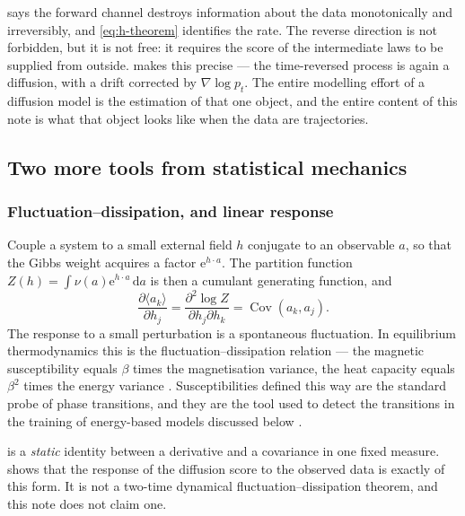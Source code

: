 \documentclass[11pt,a4paper]{article}
\newcommand{\Cov}{\operatorname{Cov}}
\newcommand{\dd}{\,\mathrm d}
\newcommand{\e}{\mathrm e}
\begin{document}
 says the forward channel destroys information about the data
monotonically and irreversibly, and \eqref{eq:h-theorem} identifies the rate. The reverse
direction is not forbidden, but it is not free: it requires the score of the intermediate
laws to be supplied from outside. \citet{anderson1982reverse} makes this precise --- the
time-reversed process is again a diffusion, with a drift corrected by
$\nabla\log p_t$. The entire modelling effort of a diffusion model is the estimation of that
one object, and the entire content of this note is what that object looks like when the data
are trajectories.

\subsection{Two more tools from statistical mechanics}\label{sec:statmech-tools}

\subsubsection{Fluctuation--dissipation, and linear response}

Couple a system to a small external field $h$ conjugate to an observable $a$, so that the
Gibbs weight acquires a factor $\e^{h\cdot a}$. The partition function
$Z(h)=\int\nu(a)\e^{h\cdot a}\dd a$ is then a cumulant generating function, and
\begin{equation}
 \frac{\partial\langle a_k\rangle}{\partial h_j}
 =\frac{\partial^2\log Z}{\partial h_j\partial h_k}
 =\Cov(a_k,a_j) .
 \label{eq:static-fdt}
\end{equation}
The response to a small perturbation is a spontaneous fluctuation. In equilibrium
thermodynamics this is the fluctuation--dissipation relation --- the magnetic susceptibility
equals $\beta$ times the magnetisation variance, the heat capacity equals $\beta^2$ times the
energy variance \citep{landau1980statistical}. Susceptibilities defined this way are the
standard probe of phase transitions, and they are the tool used to detect the transitions in
the training of energy-based models discussed below \citep{bachtis2024cascade}.

 is a \emph{static} identity between a derivative and a covariance in one
fixed measure.  shows that the response of the diffusion score to
the observed data is exactly of this form. It is not a two-time dynamical
fluctuation--dissipation theorem, and this note does not claim one.
\end{document}
